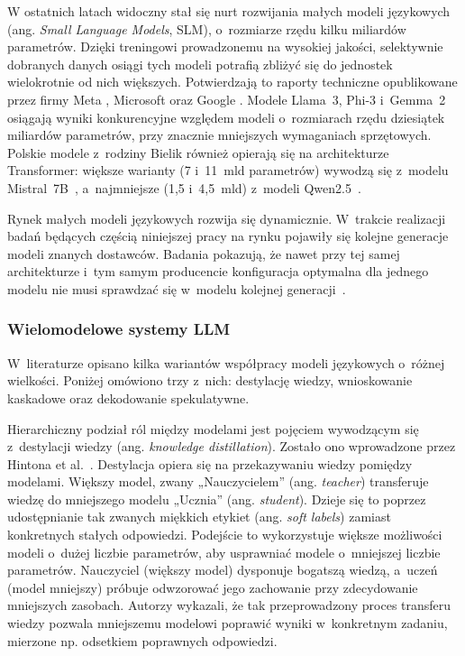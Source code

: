 W ostatnich latach widoczny stał się nurt rozwijania małych modeli językowych (ang. \emph{Small Language Models}, SLM), o~rozmiarze rzędu kilku miliardów parametrów. Dzięki treningowi prowadzonemu na wysokiej jakości, selektywnie dobranych danych osiągi tych modeli potrafią zbliżyć się do jednostek wielokrotnie od nich większych. Potwierdzają to raporty techniczne opublikowane przez firmy Meta \cite{Llama3}, Microsoft \cite{Phi3} oraz Google \cite{Gemma2}. Modele Llama~3, Phi-3 i~Gemma~2 osiągają wyniki konkurencyjne względem modeli o~rozmiarach rzędu dziesiątek miliardów parametrów, przy znacznie mniejszych wymaganiach sprzętowych. Polskie modele z~rodziny Bielik również opierają się na architekturze Transformer: większe warianty (7 i~11~mld parametrów) wywodzą się z~modelu Mistral~7B~\cite{Bielik11Bv2}, a~najmniejsze (1,5 i~4,5~mld) z~modeli Qwen2.5~\cite{BielikV3Small}.

Rynek małych modeli językowych rozwija się dynamicznie. W~trakcie realizacji badań będących częścią niniejszej pracy na rynku pojawiły się kolejne generacje modeli znanych dostawców. Badania pokazują, że nawet przy tej samej architekturze i~tym samym producencie konfiguracja optymalna dla jednego modelu nie musi sprawdzać się w~modelu kolejnej generacji~\cite{Renney2026}.

\subsubsection{Wielomodelowe systemy LLM}

W~literaturze opisano kilka wariantów współpracy modeli językowych o~różnej wielkości. Poniżej omówiono trzy z~nich: destylację wiedzy, wnioskowanie kaskadowe oraz dekodowanie spekulatywne.

Hierarchiczny podział ról między modelami jest pojęciem wywodzącym się z~destylacji wiedzy (ang. \emph{knowledge distillation}). Zostało ono wprowadzone przez Hintona et al.~\cite{Hinton2015}. Destylacja opiera się na przekazywaniu wiedzy pomiędzy modelami. Większy model, zwany „Nauczycielem” (ang. \emph{teacher}) transferuje wiedzę do mniejszego modelu „Ucznia” (ang. \emph{student}). Dzieje się to poprzez udostępnianie tak zwanych miękkich etykiet (ang. \emph{soft labels}) zamiast konkretnych stałych odpowiedzi. Podejście to wykorzystuje większe możliwości modeli o~dużej liczbie parametrów, aby usprawniać modele o~mniejszej liczbie parametrów. Nauczyciel (większy model) dysponuje bogatszą wiedzą, a~uczeń (model mniejszy) próbuje odwzorować jego zachowanie przy zdecydowanie mniejszych zasobach. Autorzy wykazali, że tak przeprowadzony proces transferu wiedzy pozwala mniejszemu modelowi poprawić wyniki w~konkretnym zadaniu, mierzone np. odsetkiem poprawnych odpowiedzi.

